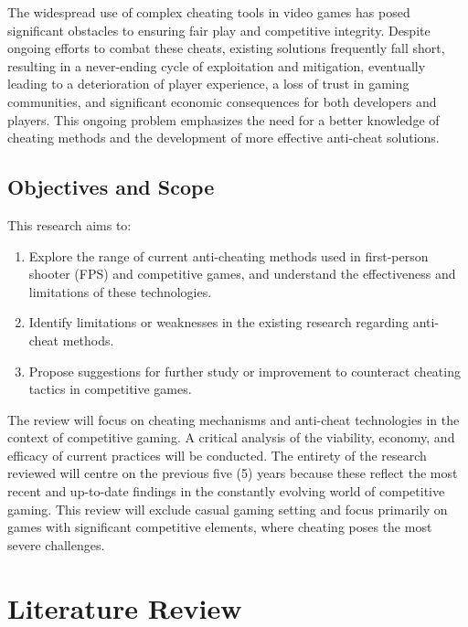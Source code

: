 \documentclass[a4paper, 12pt]{article}
\begin{document}
The widespread use of complex cheating tools in video games has posed significant obstacles to ensuring fair play and competitive integrity. Despite ongoing efforts to combat these cheats, existing solutions frequently fall short, resulting in a never-ending cycle of exploitation and mitigation, eventually leading to a deterioration of player experience, a loss of trust in gaming communities, and significant economic consequences for both developers and players. This ongoing problem emphasizes the need for a better knowledge of cheating methods and the development of more effective anti-cheat solutions. 

\subsection{Objectives and Scope}

This research aims to:

\begin{enumerate}
    \item Explore the range of current anti-cheating methods used in first-person shooter (FPS) and competitive games, and understand the effectiveness and limitations of these technologies.
    \item Identify limitations or weaknesses in the existing research regarding anti-cheat methods. 
    \item Propose suggestions for further study or improvement to counteract cheating tactics in competitive games. 
\end{enumerate}

The review will focus on cheating mechanisms and anti-cheat technologies in the context of competitive gaming. A critical analysis of the viability, economy, and efficacy of current practices will be conducted. The entirety of the research reviewed will centre on the previous five (5) years because these reflect the most recent and up-to-date findings in the constantly evolving world of competitive gaming. This review will exclude casual gaming setting and focus primarily on games with significant competitive elements, where cheating poses the most severe challenges.

\newpage
\section{Literature Review}
\end{document}
